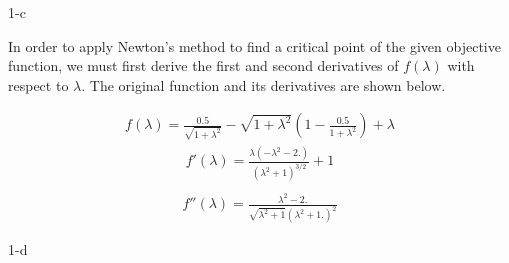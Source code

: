 \documentclass[11pt]{article}
\begin{document}
\begin{prob}{1-c}
\end{prob}
\begin{sol} 

In order to apply Newton's method to find a critical point of the given objective function, we must first derive the first and second derivatives of $f(\lambda)$ with respect to $\lambda$. The original function and its derivatives are shown below.

\begin{eqnarray*}
f(\lambda)=\frac{0.5}{\sqrt{1+\lambda^2}}-\sqrt{1+\lambda^2} \left(1-\frac{0.5}{1+\lambda^2}\right)+\lambda
\end{eqnarray*}
\begin{eqnarray*}
f'(\lambda)=\frac{\lambda \left(-\lambda^2-2.\right)}{\left(\lambda^2+1\right)^{3/2}}+1 \\
\end{eqnarray*}
\begin{eqnarray*}
f''(\lambda)=\frac{\lambda^2-2.}{\sqrt{\lambda^2+1} \left(\lambda^2+1.\right)^2}
\end{eqnarray*}

\end{sol}

\begin{prob}{1-d}
\end{prob}
\begin{sol} 



\end{sol}
\end{document}
